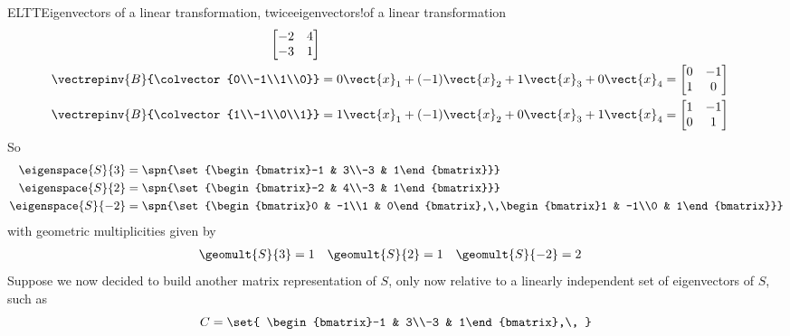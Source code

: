 \begin{example}{ELTT}{Eigenvectors of a linear transformation, twice}{eigenvectors!of a linear transformation}
\begin{align*}
\begin{bmatrix}-2 & 4\\-3 & 1\end{bmatrix}\\
%
\vectrepinv{B}{\colvector{0\\-1\\1\\0}}
&=
0\vect{x}_1+(-1)\vect{x}_2+1\vect{x}_3+0\vect{x}_4=
\begin{bmatrix}0 & -1\\1 & 0\end{bmatrix}\\
%
\vectrepinv{B}{\colvector{1\\-1\\0\\1}}
&=
1\vect{x}_1+(-1)\vect{x}_2+0\vect{x}_3+1\vect{x}_4=
\begin{bmatrix}1 & -1\\0 & 1\end{bmatrix}\\
%
\end{align*}
%
So
%
\begin{align*}
\eigenspace{S}{3}&=
\spn{\set{\begin{bmatrix}-1 & 3\\-3 & 1\end{bmatrix}}}\\
%
\eigenspace{S}{2}&=
\spn{\set{\begin{bmatrix}-2 & 4\\-3 & 1\end{bmatrix}}}\\
%
\eigenspace{S}{-2}&=
\spn{\set{\begin{bmatrix}0 & -1\\1 & 0\end{bmatrix},\,\begin{bmatrix}1 & -1\\0 & 1\end{bmatrix}}}
\end{align*}
%
with geometric multiplicities given by
%
%
\begin{align*}
\geomult{S}{3}&=1
&
\geomult{S}{2}&=1
&
\geomult{S}{-2}&=2
\end{align*}
%
Suppose we now decided to build another matrix representation of $S$, only now relative to a linearly independent set of eigenvectors of $S$, such as
%
\begin{equation*}
C=
\set{
\begin{bmatrix}-1 & 3\\-3 & 1\end{bmatrix},\,
}
\end{equation*}
\end{example}
